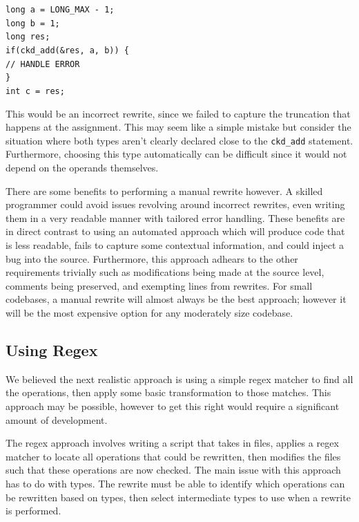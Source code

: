 \begin{flushleft}
\begin{minipage}{\linewidth}
\texttt{long a = LONG\_MAX - 1;\\
long b = 1;\\
long res;\\
if(ckd\_add(&res, a, b)) \{\\
// HANDLE ERROR\\
\}\\
int c = res;
}
\end{minipage}
\end{flushleft}

This would be an incorrect rewrite, since we failed to capture the truncation that happens at the assignment. This may seem like a simple mistake but consider the situation where both types aren't clearly declared close to the \texttt{ckd\_add} statement. Furthermore, choosing this type automatically can be difficult since it would not depend on the operands themselves.

There are some benefits to performing a manual rewrite however. A skilled programmer could avoid issues revolving around incorrect rewrites, even writing them in a very readable manner with tailored error handling. These benefits are in direct contrast to using an automated approach which will produce code that is less readable, fails to capture some contextual information, and could inject a bug into the source. Furthermore, this approach adhears to the other requirements trivially such as modifications being made at the source level, comments being preserved, and exempting lines from rewrites. For small codebases, a manual rewrite will almost always be the best approach; however it will be the most expensive option for any moderately size codebase. 

\subsection{Using Regex}

We believed the next realistic approach is using a simple regex matcher to find all the operations, then apply some basic transformation to those matches. This approach may be possible, however to get this right would require a significant amount of development.

The regex approach involves writing a script that takes in files, applies a regex matcher to locate all operations that could be rewritten, then modifies the files such that these operations are now checked. The main issue with this approach has to do with types. The rewrite must be able to identify which operations can be rewritten based on types, then select intermediate types to use when a rewrite is performed.

